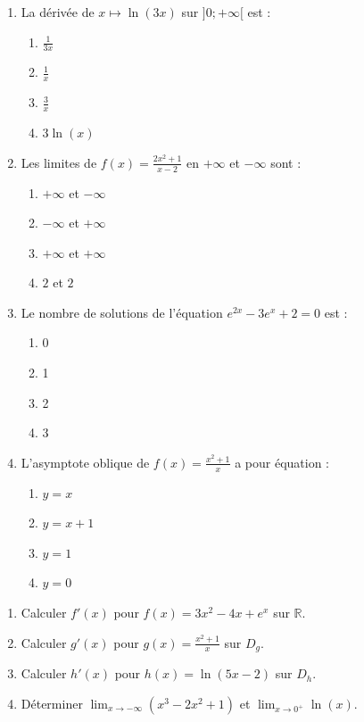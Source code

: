 \documentclass[11pt]{article}
\begin{document}
\begin{exercice}
\begin{enumerate}
    \item La dérivée de $x \mapsto \ln(3x)$ sur $]0;+\infty[$ est :
    \begin{enumerate}
        \item $\frac{1}{3x}$ \item $\frac{1}{x}$ \item $\frac{3}{x}$ \item $3\ln(x)$
    \end{enumerate}
    \item Les limites de $f(x)=\frac{2x^2+1}{x-2}$ en $+\infty$ et $-\infty$ sont :
    \begin{enumerate}
        \item $+\infty$ et $-\infty$ \item $-\infty$ et $+\infty$ \item $+\infty$ et $+\infty$ \item $2$ et $2$
    \end{enumerate}
    \item Le nombre de solutions de l'équation $e^{2x}-3e^x+2=0$ est :
    \begin{enumerate}
        \item 0 \item 1 \item 2 \item 3
    \end{enumerate}
    \item L'asymptote oblique de $f(x)=\frac{x^2+1}{x}$ a pour équation :
    \begin{enumerate}
        \item $y=x$ \item $y=x+1$ \item $y=1$ \item $y=0$
    \end{enumerate}
\end{enumerate}
\end{exercice}

\begin{exercice}
\begin{enumerate}
    \item Calculer $f'(x)$ pour $f(x)=3x^2-4x+e^x$ sur $\mathbb{R}$.
    \item Calculer $g'(x)$ pour $g(x)=\frac{x^2+1}{x}$ sur $D_g$.
    \item Calculer $h'(x)$ pour $h(x)=\ln(5x-2)$ sur $D_h$.
    \item Déterminer $\lim_{x \to -\infty} (x^3-2x^2+1)$ et $\lim_{x \to 0^+} \ln(x)$.
\end{enumerate}
\end{exercice}
\end{document}
